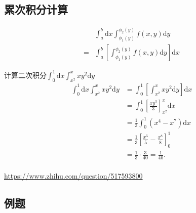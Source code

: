 \subsection{累次积分计算}

\begin{definition}[累次积分交换次序]
    \begin{align*}
         &\int_a^b \mathrm{d}x \int_{\phi_1(y)}^{\phi_2(y)} 
         f(x, y) \mathrm{d}y \\[1em]
        =&\int_a^b
        \left[
            \int_{\phi_1(y)}^{\phi_2(y)} f(x, y) \mathrm{d}y
        \right] \mathrm{d}x
    \end{align*}
\end{definition}

\begin{example}
    计算二次积分$\int_0^1 \mathrm{d}x \int_{x^2}^{x} xy^2 \mathrm{d}y$
    \begin{align*} 
        \int_{0}^{1} \text{d}x \int_{x^2}^{x} xy^2 \text{d}y 
        &= \int_{0}^{1} 
        \left[ 
            \int_{x^2}^{x} xy^2 \text{d}y 
        \right] 
        \text{d}x \\
        &= \int_{0}^{1} 
        \left[ 
            \frac{xy^3}{3} 
        \right]_{x^2}^{x} \text{d}x \\ 
        &= \frac{1}{3} \int_{0}^{1} (x^4 - x^7) \text{d}x \\
        &= \frac{1}{3} 
        \left[ 
            \frac{x^5}{5} - \frac{x^8}{8} 
        \right]_{0}^{1} \\ 
        &= \frac{1}{3} \cdot \frac{3}{40} = \frac{1}{40}. \\ 
    \end{align*}

    \url{https://www.zhihu.com/question/517593800}
\end{example}

\subsection{例题}

